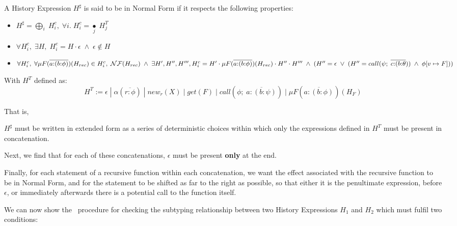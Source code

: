 \begin{definition}
    A History Expression $H^{\sharp}$ is said to be in Normal Form if it respects the following properties:
    \begin{itemize}
        \item $H^{\sharp} = \underset{i}{\bigoplus} \; H^c_i, \; \forall i. \;H^c_i = \underset{j}{\bullet} \; H^T_j$
        \item $\forall H^c_i, \;\exists H,\; H^c_i = H \cdot \epsilon \;\land\; \epsilon \notin H$
        \item $\forall H^c_i, \;\forall \mu F(\overline{a{:}(b{:}\phi)})(H_{rec}) \in H^c_i, \; \mathcal{NF}(H_{rec}) \;\land\; \exists H', H'', H''', \\
        H^c_i = H' \cdot \mu F(\overline{a{:}(b{:}\phi)})(H_{rec}) \cdot H'' \cdot H''' \;\land\; (H'' = \epsilon \;\lor\; (H'' = call(\psi; \;\overline{c{:}(b{:}\theta})) \;\land\; \phi[v \mapsto F]))$
    \end{itemize}
    With $H^T$ defined as:
    \begin{equation}
        H^T := \epsilon \;|\; \alpha(\overline{r{:}\phi}) \;|\; new_r(X) \;|\; get(F) \;|\; call(\phi; \;\overline{a{:}(b{:}\psi)}) \;|\; \mu F(\overline{a{:}(b{:}\phi)})(H_F)
    \end{equation}
    \label{def:nf}
\end{definition}

That is, 
\begin{enumerate*}[label=(\roman*)]
    \item $H^{\sharp}$ must be written in extended form as a series of deterministic choices within which only the expressions defined in $H^T$ must be present in concatenation.
    \item Next, we find that for each of these concatenations, $\epsilon$ must be present \textbf{only} at the end.
    \item Finally, for each statement of a recursive function within each concatenation, we want the effect associated with the recursive function to be in Normal Form, and for the statement to be shifted as far to the right as possible, so that either it is the penultimate expression, before $\epsilon$, or immediately afterwards there is a potential call to the function itself.
\end{enumerate*}

We can now show the \subhist\ procedure for checking the subtyping relationship between two History Expressions $H_1$ and $H_2$ which must fulfil two conditions:

